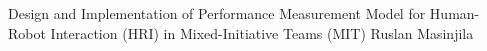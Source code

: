 \documentclass[letterpaper,12pt]{report}
\begin{document}
\thesistitle
	{Design and Implementation of Performance Measurement Model for Human-Robot   Interaction (HRI) in Mixed-Initiative Teams (MIT)}
	{Ruslan Masinjila}
	{}
	{}
	{}

\newpage
{}


%



\newpage
{}
%
%
%
%
%


%
%
\end{document}
